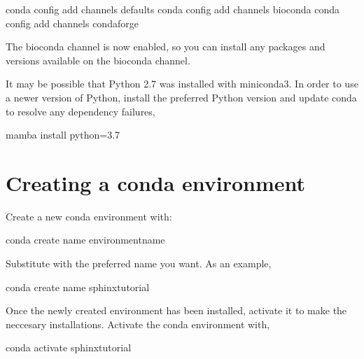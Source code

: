 \documentclass[letterpaper,10pt,english]{sphinxhowto}
\begin{document}
\begin{sphinxVerbatim}[commandchars=\\\{\}]
\PYGZdl{} conda config \PYGZhy{}\PYGZhy{}add channels defaults
\PYGZdl{} conda config \PYGZhy{}\PYGZhy{}add channels bioconda
\PYGZdl{} conda config \PYGZhy{}\PYGZhy{}add channels conda\PYGZhy{}forge
\end{sphinxVerbatim}

\sphinxAtStartPar
The bioconda channel is now enabled, so you can install any packages and versions available on the bioconda channel.

\sphinxAtStartPar
It may be possible that Python 2.7 was installed with miniconda3. In order to use a newer version of Python, install the preferred Python version and update conda to resolve any dependency failures,

\begin{sphinxVerbatim}[commandchars=\\\{\}]
\PYGZdl{} mamba install python=3.7
\end{sphinxVerbatim}


\section{Creating a conda environment}
\label{\detokenize{index:creating-a-conda-environment}}
\sphinxAtStartPar
Create a new conda environment with:

\begin{sphinxVerbatim}[commandchars=\\\{\}]
\PYGZdl{} conda create \PYGZhy{}\PYGZhy{}name \PYGZlt{}environment\PYGZhy{}name\PYGZgt{}
\end{sphinxVerbatim}

\sphinxAtStartPar
Substitute  with the preferred name you want. As an example,

\begin{sphinxVerbatim}[commandchars=\\\{\}]
\PYGZdl{} conda create \PYGZhy{}\PYGZhy{}name sphinx\PYGZhy{}tutorial
\end{sphinxVerbatim}

\sphinxAtStartPar
Once the newly created environment has been installed, activate it to make the neccesary installations. Activate the conda environment with,

\begin{sphinxVerbatim}[commandchars=\\\{\}]
\PYGZdl{} conda activate sphinx\PYGZhy{}tutorial
\end{sphinxVerbatim}
\end{document}
